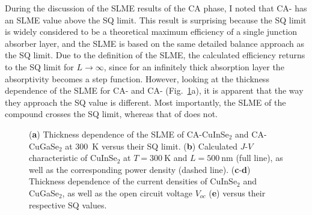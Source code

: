 \begin{refsection}
 
During the discussion of the \gls{SLME} results of the \gls{CA} phase, I noted that 
\mbox{CA-} has an \gls{SLME} value above the \gls{SQ} limit. This result is 
surprising because the \gls{SQ} limit is widely considered to be a theoretical 
maximum efficiency of a single junction absorber layer, and the \gls{SLME} is based 
on the same detailed balance approach as the \gls{SQ} limit. Due to the definition 
of the \gls{SLME}, the calculated efficiency returns to the \gls{SQ} limit for \mbox{$L 
\rightarrow \infty$}, since for an infinitely thick absorption layer the 
absorptivity becomes a step function. However, looking at the thickness 
dependence of the \gls{SLME} for \mbox{CA-} and \mbox{CA-} 
(Fig.~\ref{slme:fig-thickness_analysis}a), it is apparent that the way they approach the \gls{SQ} value 
is different. Most importantly, the \gls{SLME} of the compound  crosses 
the \gls{SQ} limit, whereas that of  does not. 

\begin{figure}[ht]
\captionsetup{width=0.9\textwidth}
\centering

\caption{(\textsf{\textbf{a}}) Thickness dependence of the \gls{SLME} of \gls{CA}-CuInSe$_2$ and \gls{CA}-CuGaSe$_2$ at 300~\si{\kelvin} versus their \gls{SQ} limit. (\textsf{\textbf{b}}) Calculated $J$-$V$ characteristic of CuInSe$_2$ at $T=300~\si{\kelvin}$ and $L = 500~\si{\nano\meter}$ (full line), as well as the corresponding power density (dashed line). (\textsf{\textbf{c}}-\textsf{\textbf{d}}) Thickness dependence of the current densities of CuInSe$_2$ and CuGaSe$_2$, as well as the open circuit voltage $V_{oc}$ (\textsf{\textbf{e}}) versus their respective \gls{SQ} values.}
\label{slme:fig-thickness_analysis}
\end{figure}


\end{refsection}
